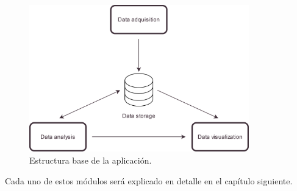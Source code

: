 \begin{figure}[h]
    \centering
    \includegraphics[width=0.85\textwidth]{Imagenes/Chapter_3/structure.png}
    \caption{Estructura base de la aplicación.}
    \label{fig:aprsint-logo}
\end{figure}

Cada uno de estos módulos será explicado en detalle en el capítulo siguiente.